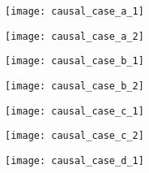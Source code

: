 \begin{figure}[htbp]
  \centering
  \begin{subfigure}{0.55\textwidth}
  	\centering
  	\begin{minipage}[b]{1\textwidth}
  	  \centering
  	  \texttt{[image: causal\_case\_a\_1]}
  	\end{minipage}
  	\begin{minipage}[b]{1\textwidth}
  	  \vspace{1em}
  	  \centering
  	  \texttt{[image: causal\_case\_a\_2]}
  	\end{minipage}
  	\caption{}
  	\label{fig:causal_case_a}
  \end{subfigure}
  \begin{subfigure}{0.55\textwidth}
  	\centering
  	\begin{minipage}[b]{1\textwidth}
  	  \centering
  	  \texttt{[image: causal\_case\_b\_1]}
  	\end{minipage}
  	\begin{minipage}[b]{1\textwidth}
  	  \vspace{1em}
  	  \centering
  	  \texttt{[image: causal\_case\_b\_2]}
  	\end{minipage}
  	\caption{}
  	\label{fig:causal_case_b}
  \end{subfigure}
  \begin{subfigure}{0.7\textwidth}
  	\vspace{1em}
  	\centering
  	\begin{minipage}[b]{1\textwidth}
  	  \centering
  	  \texttt{[image: causal\_case\_c\_1]}
  	\end{minipage}
  	\begin{minipage}[b]{1\textwidth}
  	  \vspace{1em}
  	  \centering
  	  \texttt{[image: causal\_case\_c\_2]}
  	\end{minipage}
  	\caption{}
  	\label{fig:causal_case_c}
  \end{subfigure}
  \begin{subfigure}{0.85\textwidth}
  	\vspace{1em}
  	\centering
  	\begin{minipage}[b]{1\textwidth}
  	  \centering
  	  \texttt{[image: causal\_case\_d\_1]}
  	\end{minipage}
  	\begin{minipage}[b]{1\textwidth}
  	  \vspace{1em}

\end{minipage}
\end{subfigure}
\end{figure}
